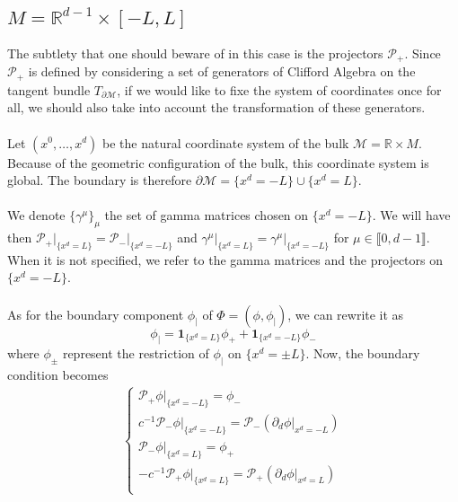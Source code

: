 \subsection{${M} = \mathbb{R}^{d-1} \times [-L, L]$ }\label{wen-subsect-saw2}
The subtlety that one should beware of in this case is the projectors $\mathcal{P}_+$.
Since $\mathcal{P}_+$ is defined by considering a set of generators of Clifford Algebra on the tangent bundle $T_{ \partial \mathcal{M}}$, 
if we would like to fixe the system of coordinates once for all,
we should also take into account the transformation of these generators. \\\\
Let $(x^0, \ldots, x^d)$ be the natural coordinate system of the bulk $\mathcal{M} =\mathbb{R}\times M $. 
Because of the geometric configuration of the bulk, 
this coordinate system is global. 
The boundary is therefore $\partial \mathcal{M} = \{x^d = -L \} \cup \{ x^d = L \}$.
\\\\
We denote $\{\gamma^\mu\}_\mu$ the set of gamma matrices chosen on $\{x^d  = - L \}$. 
We will have then $\mathcal{P}_+\vert_{\{x^d = L\}} = \mathcal{P}_-\vert_{\{x^d = -L\}}$ and $\gamma^\mu\vert_{\{x^d = L\}}=\gamma^\mu\vert_{\{x^d = -L\}}$ for $\mu\in\llbracket 0, d-1 \rrbracket$.
When it is not specified, we refer to the gamma matrices and the projectors on $\{x^d = -L\}$. \\\\
%
As for the boundary component $\phi_|$ of $\Phi= (\phi, \phi_|)$,
we can rewrite it as
\begin{equation*}
\phi_| = \mathbf{1}_{\{x^d = L \}}\phi_+ + \mathbf{1}_{\{x^d = - L \}}\phi_-
\end{equation*}
where $\phi_\pm$ represent the restriction of $\phi_|$ on $\{x^d = \pm L \}$.
Now, the boundary condition becomes
\begin{equation}\label{wen-saw2bound}
\begin{split}
\begin{cases}
\mathcal{P}_+ \phi\vert_{\{x^d = -L\}} = \phi_- \\
c^{-1}\mathcal{P}_-\phi\vert_{\{x^d = -L\}} = \mathcal{P}_-(\partial_d \phi\vert_{x^d = -L}) \\
\mathcal{P}_- \phi\vert_{\{x^d = L\}} =\phi_+ \\
-c^{-1}\mathcal{P}_+\phi\vert_{\{x^d = L\}} = \mathcal{P}_+(\partial_d \phi\vert_{x^d = L}) \\
\end{cases}
\end{split}
\end{equation}
